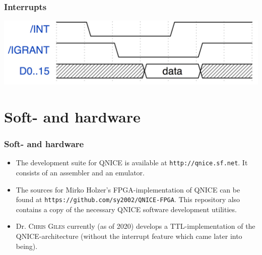 \documentclass{beamer}
\begin{document}
%
  \begin{frame}
   \frametitle{Interrupts}
   \begin{center}
    \includegraphics[width=.8\textwidth]{interrupt_timing.jpg}
   \end{center}
%  
%  
  \end{frame}
%
 \section{Soft- and hardware}
  \begin{frame}
   \frametitle{Soft- and hardware}
   \begin{itemize}
    \item The development suite for QNICE is available at 
     \texttt{http://qnice.sf.net}. It consists of an assembler and
     an emulator.
    \item The sources for Mirko Holzer's FPGA-implementation of
     QNICE can be found at \texttt{https://github.com/sy2002/QNICE-FPGA}.
     This repository also contains a copy of the necessary QNICE 
     software development utilities.
    \item Dr. \textsc{Chris Giles} currently (as of 2020) develops a
     TTL-implementation of the QNICE-architecture (without the interrupt
     feature which came later into being).
   \end{itemize}
  \end{frame}
%
\end{document}
